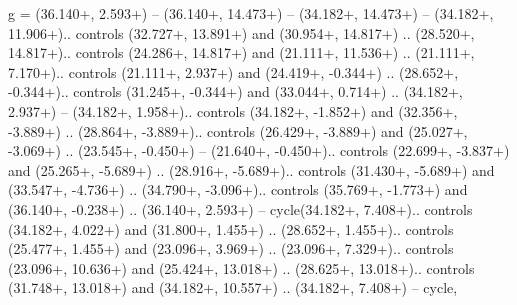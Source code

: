 {g} = {(36.140+\ctpXshift, 2.593+\ctpYshift) -- (36.140+\ctpXshift, 14.473+\ctpYshift) -- (34.182+\ctpXshift, 14.473+\ctpYshift) -- (34.182+\ctpXshift, 11.906+\ctpYshift).. controls (32.727+\ctpXshift, 13.891+\ctpYshift) and (30.954+\ctpXshift, 14.817+\ctpYshift) .. (28.520+\ctpXshift, 14.817+\ctpYshift).. controls (24.286+\ctpXshift, 14.817+\ctpYshift) and (21.111+\ctpXshift, 11.536+\ctpYshift) .. (21.111+\ctpXshift, 7.170+\ctpYshift).. controls (21.111+\ctpXshift, 2.937+\ctpYshift) and (24.419+\ctpXshift, -0.344+\ctpYshift) .. (28.652+\ctpXshift, -0.344+\ctpYshift).. controls (31.245+\ctpXshift, -0.344+\ctpYshift) and (33.044+\ctpXshift, 0.714+\ctpYshift) .. (34.182+\ctpXshift, 2.937+\ctpYshift) -- (34.182+\ctpXshift, 1.958+\ctpYshift).. controls (34.182+\ctpXshift, -1.852+\ctpYshift) and (32.356+\ctpXshift, -3.889+\ctpYshift) .. (28.864+\ctpXshift, -3.889+\ctpYshift).. controls (26.429+\ctpXshift, -3.889+\ctpYshift) and (25.027+\ctpXshift, -3.069+\ctpYshift) .. (23.545+\ctpXshift, -0.450+\ctpYshift) -- (21.640+\ctpXshift, -0.450+\ctpYshift).. controls (22.699+\ctpXshift, -3.837+\ctpYshift) and (25.265+\ctpXshift, -5.689+\ctpYshift) .. (28.916+\ctpXshift, -5.689+\ctpYshift).. controls (31.430+\ctpXshift, -5.689+\ctpYshift) and (33.547+\ctpXshift, -4.736+\ctpYshift) .. (34.790+\ctpXshift, -3.096+\ctpYshift).. controls (35.769+\ctpXshift, -1.773+\ctpYshift) and (36.140+\ctpXshift, -0.238+\ctpYshift) .. (36.140+\ctpXshift, 2.593+\ctpYshift) -- cycle(34.182+\ctpXshift, 7.408+\ctpYshift).. controls (34.182+\ctpXshift, 4.022+\ctpYshift) and (31.800+\ctpXshift, 1.455+\ctpYshift) .. (28.652+\ctpXshift, 1.455+\ctpYshift).. controls (25.477+\ctpXshift, 1.455+\ctpYshift) and (23.096+\ctpXshift, 3.969+\ctpYshift) .. (23.096+\ctpXshift, 7.329+\ctpYshift).. controls (23.096+\ctpXshift, 10.636+\ctpYshift) and (25.424+\ctpXshift, 13.018+\ctpYshift) .. (28.625+\ctpXshift, 13.018+\ctpYshift).. controls (31.748+\ctpXshift, 13.018+\ctpYshift) and (34.182+\ctpXshift, 10.557+\ctpYshift) .. (34.182+\ctpXshift, 7.408+\ctpYshift) -- cycle},
